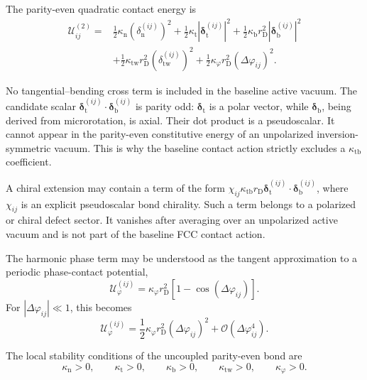 The parity-even quadratic contact energy is
\begin{equation}
\begin{aligned}
    \mathcal{U}_{ij}^{(2)} ={}& \frac{1}{2} \kappa_{\mathrm{n}} (\delta_{\mathrm{n}}^{(ij)})^2 + \frac{1}{2} \kappa_{\mathrm{t}} |\boldsymbol{\delta}_{\mathrm{t}}^{(ij)}|^2 + \frac{1}{2} \kappa_{\mathrm{b}} r_{\mathrm{D}}^2 |\boldsymbol{\delta}_{\mathrm{b}}^{(ij)}|^2 \\
    &+ \frac{1}{2} \kappa_{\mathrm{tw}} r_{\mathrm{D}}^2 (\delta_{\mathrm{tw}}^{(ij)})^2 + \frac{1}{2} \kappa_\varphi r_{\mathrm{D}}^2 (\Delta\varphi_{ij})^2.
\end{aligned}
\end{equation}

No tangential--bending cross term is included in the baseline active vacuum. The candidate scalar $\boldsymbol{\delta}_{\mathrm{t}}^{(ij)} \cdot \boldsymbol{\delta}_{\mathrm{b}}^{(ij)}$ is parity odd: $\boldsymbol{\delta}_{\mathrm{t}}$ is a polar vector, while $\boldsymbol{\delta}_{\mathrm{b}}$, being derived from microrotation, is axial. Their dot product is a pseudoscalar. It cannot appear in the parity-even constitutive energy of an unpolarized inversion-symmetric vacuum. This is why the baseline contact action strictly excludes a $\kappa_{\mathrm{tb}}$ coefficient.

A chiral extension may contain a term of the form $\chi_{ij} \kappa_{\mathrm{tb}} r_{\mathrm{D}} \boldsymbol{\delta}_{\mathrm{t}}^{(ij)} \cdot \boldsymbol{\delta}_{\mathrm{b}}^{(ij)}$, where $\chi_{ij}$ is an explicit pseudoscalar bond chirality. Such a term belongs to a polarized or chiral defect sector. It vanishes after averaging over an unpolarized active vacuum and is not part of the baseline FCC contact action.

The harmonic phase term may be understood as the tangent approximation to a periodic phase-contact potential,
\begin{equation}
    \mathcal{U}_{\varphi}^{(ij)} = \kappa_\varphi r_{\mathrm{D}}^2 \left[ 1-\cos(\Delta\varphi_{ij}) \right].
\end{equation}
For $|\Delta\varphi_{ij}| \ll 1$, this becomes
\begin{equation}
    \mathcal{U}_{\varphi}^{(ij)} = \frac{1}{2} \kappa_\varphi r_{\mathrm{D}}^2 (\Delta\varphi_{ij})^2 + \mathcal{O}(\Delta\varphi_{ij}^4).
\end{equation}

The local stability conditions of the uncoupled parity-even bond are
\begin{equation}
    \kappa_{\mathrm{n}}>0, \qquad \kappa_{\mathrm{t}}>0, \qquad \kappa_{\mathrm{b}}>0, \qquad \kappa_{\mathrm{tw}}>0, \qquad \kappa_\varphi>0.
\end{equation}

